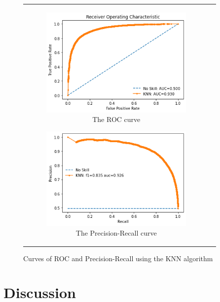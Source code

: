 \begin{figure}[H]
\begin{tabular}{@{}cc@{}}
\begin{subfigure}{0.5\textwidth}
  \centering
  \includegraphics[width=7.5cm]{fig/chapter5/KNN/ROC_new.png}
  \caption{\footnotesize{The \acrshort{ROC} curve}}
  \label{fig:knnroc}
\end{subfigure} 
\begin{subfigure}{0.5\textwidth}
  \centering
  \includegraphics[width=7.5cm]{fig/chapter5/KNN/Precision-Recall_new.png}
  \caption{\footnotesize{The Precision-Recall curve}}
  \label{fig:knnprerec}
\end{subfigure} \\
\end{tabular}
\caption{Curves of \acrshort{ROC} and Precision-Recall using the \acrshort{KNN} algorithm}
\label{fig:knncurves}
\end{figure}

\section{Discussion}

